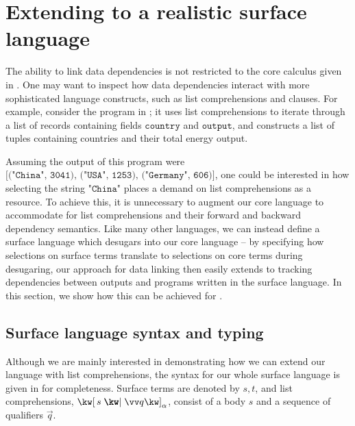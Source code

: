 \section{Extending to a realistic surface language}
\label{sec:surface-language}

The ability to link data dependencies is not restricted to the core calculus given in . One may want to inspect how data dependencies interact with more sophisticated language constructs, such as list comprehensions and clauses. For example, consider the program in ; it uses list comprehensions to iterate through a list of records containing fields $\texttt{country}$ and $\texttt{output}$, and constructs a list of tuples containing countries and their total energy output.

Assuming the output of this program were $\texttt{[("China", 3041), ("USA", 1253), ("Germany", 606)]}$, one could be interested in how selecting the string $\texttt{"China"}$ places a demand on list comprehensions as a resource. To achieve this, it is unnecessary to augment our core language to accommodate for list comprehensions and their forward and backward dependency semantics. Like many other languages, we can instead define a surface language which desugars into our core language -- by specifying how selections on surface terms translate to selections on core terms during desugaring, our approach for data linking then easily extends to tracking dependencies between outputs and programs written in the surface language. In this section, we show how this can be achieved for .



\subsection{Surface language syntax and typing}


Although we are mainly interested in demonstrating how we can extend our language with list comprehensions, the syntax for our whole surface language is given in  for completeness. Surface terms are denoted by $s, t$, and list comprehensions, $\annListComp{s}{\vec{q}}{\alpha}$, consist of a body $s$ and a sequence of qualifiers $\vec{q}$.

